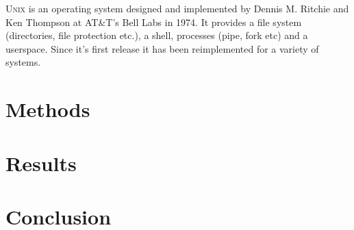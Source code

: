 \documentclass{report}
\begin{document}
\textsc{Unix} \cite{ritchie1978unix} is an operating system designed and
implemented by Dennis M. Ritchie and Ken Thompson at AT\&T's Bell Labs in 1974.
It provides a file system (directories, file protection etc.), a shell,
processes (pipe, fork etc) and a userspace. Since it's first release it has been
reimplemented for a variety of systems.

\chapter{Methods}

\chapter{Results}

\chapter{Conclusion}



\end{document}
